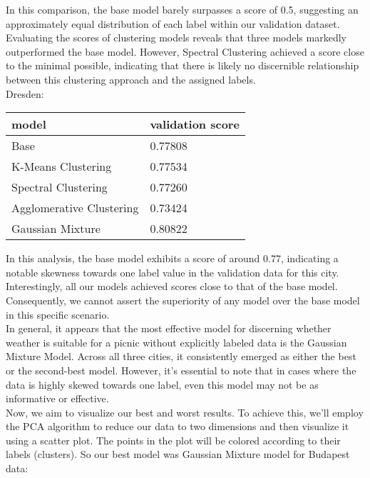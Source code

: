 \documentclass[a4paper]{article}
\begin{document}
	In this comparison, the base model barely surpasses a score of 0.5, suggesting an approximately equal distribution of each label within our validation dataset. Evaluating the scores of clustering models reveals that three models markedly outperformed the base model. However, Spectral Clustering achieved a score close to the minimal possible, indicating that there is likely no discernible relationship between this clustering approach and the assigned labels.
	\\

	Dresden:
	\begin{table}[!h]
		\begin{tabular}{|l|l|}
			\hline
			model &  validation score  \\ \hline
			Base & 0.77808 \\ \hline
			K-Means Clustering & 0.77534 \\ \hline
			Spectral Clustering &  0.77260 \\ \hline
			Agglomerative Clustering  &  0.73424 \\ \hline
			Gaussian Mixture &  0.80822 \\ \hline
		\end{tabular}
	\end{table} 
	
	In this analysis, the base model exhibits a score of around 0.77, indicating a notable skewness towards one label value in the validation data for this city. Interestingly, all our models achieved scores close to that of the base model. Consequently, we cannot assert the superiority of any model over the base model in this specific scenario.
	\\
	
	In general, it appears that the most effective model for discerning whether weather is suitable for a picnic without explicitly labeled data is the Gaussian Mixture Model. Across all three cities, it consistently emerged as either the best or the second-best model. However, it's essential to note that in cases where the data is highly skewed towards one label, even this model may not be as informative or effective.
	\\
	
	Now, we aim to visualize our best and worst results. To achieve this, we'll employ the PCA algorithm to reduce our data to two dimensions and then visualize it using a scatter plot. The points in the plot will be colored according to their labels (clusters).
	\newpage
	So our best model was Gaussian Mixture model for Budapest data:
	
\end{document}
